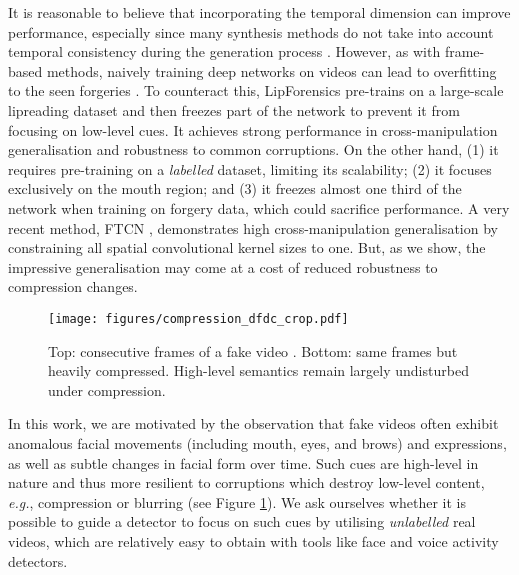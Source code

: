 \documentclass[10pt,twocolumn,letterpaper]{article}
\begin{document}
It is reasonable to believe that incorporating the temporal dimension can improve performance, especially since many synthesis methods do not take into account temporal consistency during the generation process \cite{rossler2019faceforensics++}. However, as with frame-based methods, naively training deep networks on videos can lead to overfitting to the seen forgeries \cite{haliassos2021lips, sun2021improving, zheng2021exploring}. To counteract this, LipForensics \cite{haliassos2021lips} pre-trains on a large-scale lipreading dataset and then freezes part of the network to prevent it from focusing on low-level cues. It achieves strong performance in cross-manipulation generalisation and robustness to common corruptions. On the other hand, (1) it requires pre-training on a \textit{labelled} dataset, limiting its scalability; (2) it focuses exclusively on the mouth region; and (3) it freezes almost one third of the network when training on forgery data, which could sacrifice performance. A very recent method, FTCN \cite{zheng2021exploring}, demonstrates high cross-manipulation generalisation by constraining all spatial convolutional kernel sizes to one. But, as we show, the impressive generalisation may come at a cost of reduced robustness to compression changes.

\begin{figure}
\begin{center}
  \texttt{[image: figures/compression\_dfdc\_crop.pdf]}
\end{center}
  \caption{Top: consecutive frames of a fake video \cite{dolhansky2020deepfake}. Bottom: same frames but heavily compressed. High-level semantics remain largely undisturbed under compression.}
\label{fig:compression_imgs}
\end{figure}

In this work, we are motivated by the observation that fake videos often exhibit anomalous facial movements (including mouth, eyes, and brows) and expressions, as well as subtle changes in facial form over time. Such cues are high-level in nature and thus more resilient to corruptions which destroy low-level content, \textit{e.g.}, compression or blurring (see Figure \ref{fig:compression_imgs}). We ask ourselves whether it is possible to guide a detector to focus on such cues by utilising \textit{unlabelled} real videos, which are relatively easy to obtain with tools like face and voice activity detectors.
\end{document}
